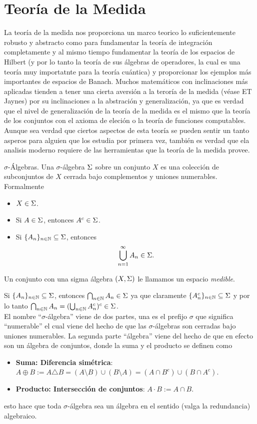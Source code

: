 \documentclass[main.tex]{subfiles}
\begin{document}
\section{Teoría de la Medida}
\noindent La teoría de la medida nos proporciona un marco teorico lo suficientemente robusto y abstracto como para fundamentar la teoría de integración completamente y al mismo tiempo fundamentar la teoría de los espacios de Hilbert (y por lo tanto la teoría de sus álgebras de operadores, la cual es una teoría muy importatnte para la teoría cuántica) y proporcionar los ejemplos más importantes de espacios de Banach. Muchos matemáticos con inclinaciones más aplicadas tienden a tener una cierta aversión a la teroría de la medida (véase ET Jaynes) por su inclinaciones a la abstración y generalización, ya que es verdad que el nivel de generalización de la teoría de la medida es el mismo que la teoría de los conjuntos con el axioma de eleción o la teoría de funciones computables. Aunque sea verdad que ciertos aspectos de esta teoría se pueden sentir un tanto asperos para alguien que los estudia por primera vez, también es verdad que ela analisis moderno requiere de las herramientas que la teoría de la medida provee.

\begin{def.}{$\sigma$-Álgebras.}
Una $\sigma$-álgebra $\Sigma$ sobre un conjunto $X$ es una colección de subconjuntos de $X$ cerrada bajo complementos y uniones numerables. Formalmente
\begin{itemize}
    \item $X \in \Sigma$.
    \item Si $A \in \Sigma$, entonces $A^c \in \Sigma$.
    \item Si $\{A_n\}_{n \in \mathbb N } \subseteq \Sigma$, entonces
      \[
      \bigcup_{n=1}^\infty A_n \in \Sigma.
      \]
\end{itemize}
Un conjunto con una sigma álgebra $(X,\Sigma)$ le llamamos un espacio \emph{medible}.
\end{def.}
\obs Si $\{A_n\}_{n \in \mathbb{N}} \subseteq \Sigma$, entonces $\bigcap_{n\in \mathbb N } A_n \in \Sigma$ ya que claramente $\{A_n^c\}_{n \in \mathbb{N}} \subseteq \Sigma$ y por lo tanto $\bigcap_{n\in \mathbb N } A_n=(\bigcup_{n\in \mathbb N } A_n^c)^c\in\Sigma$.\\
\obs El nombre ``$\sigma$-álgebra'' viene de dos partes, una es el prefijo $\sigma$ que significa ``numerable'' el cual viene del hecho de que las $\sigma$-álgebras son cerradas bajo uniones numerables. La segunda parte ``álgebra'' viene del hecho de que en efecto son un álgebra de conjuntos, donde la suma y el producto se definen como
\begin{itemize}
    \item \textbf{Suma: Diferencia simétrica}: $A\oplus B:=A\triangle B=(A\setminus B)\cup(B\setminus A)=(A\cap B^c)\cup(B\cap A^c)$.
    \item \textbf{Producto: Intersección de conjuntos}: $A\cdot B:= A\cap B$.
\end{itemize}
esto hace que toda $\sigma$-álgebra sea un álgebra en el sentido (valga la redundancia) algebraico.
\end{document}
